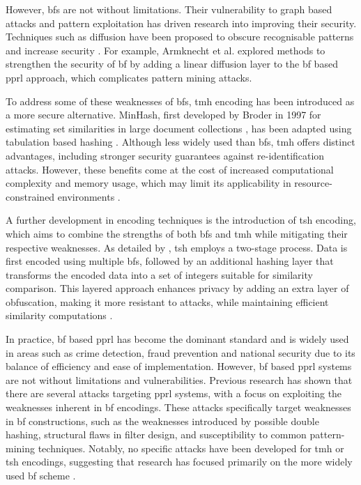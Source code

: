 However, \ac{bf}s are not without limitations.
Their vulnerability to graph based attacks and pattern exploitation has driven research into improving their security.
Techniques such as diffusion have been proposed to obscure recognisable patterns and increase security \cite{schaefer2024,armknecht2023strengthening}.
For example, Armknecht et al. \cite{armknecht2023strengthening} explored methods to strengthen the security of \ac{bf} by adding a linear diffusion layer to the \ac{bf} based \ac{pprl} approach, which complicates pattern mining attacks.

To address some of these weaknesses of \ac{bf}s, \ac{tmh} encoding has been introduced as a more secure alternative.
MinHash, first developed by Broder in 1997 for estimating set similarities in large document collections \cite{broder1997resemblance}, has been adapted using tabulation based hashing \cite{smith2017secure}.
Although less widely used than \ac{bf}s, \ac{tmh} offers distinct advantages, including stronger security guarantees against re-identification attacks.
However, these benefits come at the cost of increased computational complexity and memory usage, which may limit its applicability in resource-constrained environments \cite{smith2017secure}.

A further development in encoding techniques is the introduction of \ac{tsh} encoding, which aims to combine the strengths of both \ac{bf}s and \ac{tmh} while mitigating their respective weaknesses.
As detailed by \cite{ranbaduge2020secure}, \ac{tsh} employs a two-stage process.
Data is first encoded using multiple \ac{bf}s, followed by an additional hashing layer that transforms the encoded data into a set of integers suitable for similarity comparison.
This layered approach enhances privacy by adding an extra layer of obfuscation, making it more resistant to attacks, while maintaining efficient similarity computations \cite{vidanage2020graph, ranbaduge2020secure}.

In practice, \ac{bf} based \ac{pprl} has become the dominant standard and is widely used in areas such as crime detection, fraud prevention and national security due to its balance of efficiency and ease of implementation.
However, \ac{bf} based \ac{pprl} systems are not without limitations and vulnerabilities.
Previous research has shown that there are several attacks targeting \ac{pprl} systems, with a focus on exploiting the weaknesses inherent in \ac{bf} encodings.
These attacks specifically target weaknesses in \ac{bf} constructions, such as the weaknesses introduced by possible double hashing, structural flaws in filter design, and susceptibility to common pattern-mining techniques.
Notably, no specific attacks have been developed for \ac{tmh} or \ac{tsh} encodings, suggesting that research has focused primarily on the more widely used \ac{bf} scheme \cite{vidanage2020graph}.


